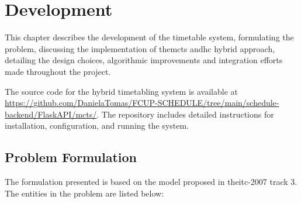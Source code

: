 \pretocmd{\chapter}{\glsresetall}{}{}


\chapter{Development}


\label{Development}

This chapter describes the development of the timetable system, formulating the problem, discussing the implementation of the\ac{mcts} and\ac{hc} hybrid approach, detailing the design choices, algorithmic improvements and integration efforts made throughout the project. 

The source code for the hybrid timetabling system is available at \url{https://github.com/DanielaTomas/FCUP-SCHEDULE/tree/main/schedule-backend/FlaskAPI/mcts/}. The repository includes detailed instructions for installation, configuration, and running the system.

\section{Problem Formulation}

The formulation presented is based on the model proposed in the\ac{itc-2007} track 3. The entities in the problem are listed below:

